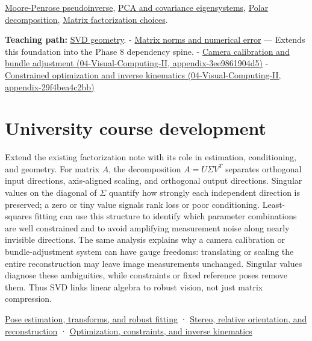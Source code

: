 \hyperref[appendix-541306fdbc1b]{Moore-Penrose pseudoinverse}, \hyperref[appendix-ad175ef3c5bf]{PCA and covariance eigensystems}, \hyperref[appendix-73f5bcf7a462]{Polar decomposition}, \hyperref[appendix-221a483bec2d]{Matrix factorization choices}.

\textbf{Teaching path:} \href{Continuous\%20Notes/Computing\%20Foundations\%20-\%20From\%20Bits\%20to\%20C++\%20and\%20Systems\%20APIs\#Singular\%20value\%20decomposition\%20covers\%20every\%20rectangular\%20map}{SVD geometry}. - \hyperref[appendix-f8657bac66e5]{Matrix norms and numerical error} --- Extends this foundation into the Phase 8 dependency spine. - \href{../04-Visual-Computing-II/main.pdf\#nameddest=appendix-3ee9861904d5}{Camera calibration and bundle adjustment (04-Visual-Computing-II, appendix-3ee9861904d5)} - \href{../04-Visual-Computing-II/main.pdf\#nameddest=appendix-29f4bea4c2bb}{Constrained optimization and inverse kinematics (04-Visual-Computing-II, appendix-29f4bea4c2bb)}

\section{University course development}\label{appendix-1fad5e7f36fa-university-course-development}

Extend the existing factorization note with its role in estimation, conditioning, and geometry. For matrix \(A\), the decomposition \(A=U\Sigma V^T\) separates orthogonal input directions, axis-aligned scaling, and orthogonal output directions. Singular values on the diagonal of \(\Sigma\) quantify how strongly each independent direction is preserved; a zero or tiny value signals rank loss or poor conditioning. Least-squares fitting can use this structure to identify which parameter combinations are well constrained and to avoid amplifying measurement noise along nearly invisible directions. The same analysis explains why a camera calibration or bundle-adjustment system can have gauge freedoms: translating or scaling the entire reconstruction may leave image measurements unchanged. Singular values diagnose these ambiguities, while constraints or fixed reference poses remove them. Thus SVD links linear algebra to robust vision, not just matrix compression.

\href{Continuous\%20Notes/University\%20-\%20Worlds,\%20Images\%20and\%20Inference\%20-\%20Graphics,\%20Vision\%20and\%20Photography\#Pose\%20estimation,\%20transforms,\%20and\%20robust\%20fitting}{Pose estimation, transforms, and robust fitting} · \href{Continuous\%20Notes/University\%20-\%20Worlds,\%20Images\%20and\%20Inference\%20-\%20Graphics,\%20Vision\%20and\%20Photography\#Stereo,\%20relative\%20orientation,\%20and\%20reconstruction}{Stereo, relative orientation, and reconstruction} · \href{Continuous\%20Notes/University\%20-\%20Worlds,\%20Images\%20and\%20Inference\%20-\%20Graphics,\%20Vision\%20and\%20Photography\#Optimization,\%20constraints,\%20and\%20inverse\%20kinematics}{Optimization, constraints, and inverse kinematics}
